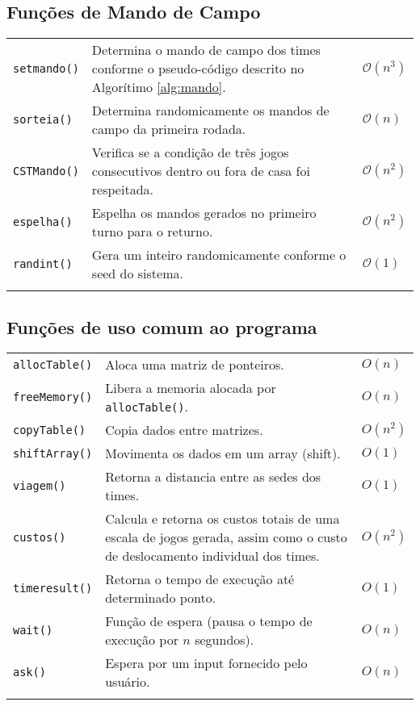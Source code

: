 \documentclass[12pt,a4paper]{article}
\begin{document}
\subsection{Funções de Mando de Campo}

\begin{longtable}{p{3cm} p{11cm} p{1cm}}
	\texttt{setmando()} & Determina o mando de campo dos times conforme o pseudo-código descrito no Algorítimo \ref{alg:mando}. & $\mathcal{O}(n^3)$ \\
	\texttt{sorteia()} & Determina randomicamente os mandos de campo da primeira rodada. & $\mathcal{O}(n)$ \\
	\texttt{CSTMando()} & Verifica se a condição de três jogos consecutivos dentro ou fora de casa foi respeitada. & $\mathcal{O}(n^2)$ \\
	\texttt{espelha()} & Espelha os mandos gerados no primeiro turno para o returno. & $\mathcal{O}(n^2)$ \\
	\texttt{randint()} & Gera um inteiro randomicamente conforme o seed do sistema. & $\mathcal{O}(1)$ \\
	\label{tab:mando}
\end{longtable}
\vspace{-0.5cm}

\subsection{Funções de uso comum ao programa}

\begin{longtable}{p{3cm} p{11cm} p{1cm}}
	\texttt{allocTable()} & Aloca uma matriz de ponteiros. & $O(n)$ \\
	\texttt{freeMemory()} & Libera a memoria alocada por \texttt{allocTable()}. & $O(n)$ \\
	\texttt{copyTable()} & Copia dados entre matrizes. & $O(n^2)$ \\
	\texttt{shiftArray()} & Movimenta os dados em um array (shift). & $O(1)$ \\
	\texttt{viagem()} & Retorna a distancia entre as sedes dos times. & $O(1)$ \\
	\texttt{custos()} & Calcula e retorna os custos totais de uma escala de jogos gerada, assim como o custo de deslocamento individual dos times. & $O(n^2)$ \\
	\texttt{timeresult()} & Retorna o tempo de execução até determinado ponto. & $O(1)$ \\
	\texttt{wait()} & Função de espera (pausa o tempo de execução por $n$ segundos). & $O(n)$ \\
	\texttt{ask()} & Espera por um input fornecido pelo usuário. & $O(n)$ \\
	\label{tab:comum}
\end{longtable}
\end{document}
